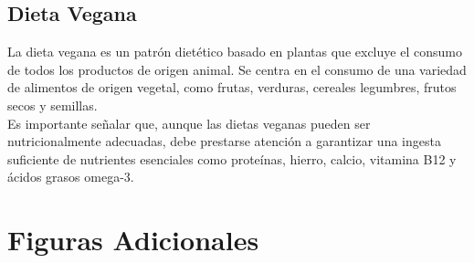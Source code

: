 \documentclass[12pt,a4paper]{article}
\begin{document}
{{        \subsection{Dieta Vegana}
        {
            \cite{marvastipopular} La dieta vegana es un patrón dietético basado en 
            plantas que excluye el consumo de todos los productos de origen animal. Se 
            centra en el consumo de una variedad de alimentos de origen vegetal, como 
            frutas, verduras, cereales legumbres, frutos secos y semillas.\\

            Es importante señalar que, aunque las dietas veganas pueden ser 
            nutricionalmente adecuadas, debe prestarse atención a garantizar una 
            ingesta suficiente de nutrientes esenciales como proteínas, hierro, 
            calcio, vitamina B12 y ácidos grasos omega-3.
        }
        }

        \newpage

        \section{Figuras Adicionales}\label{anexo:B}
        {
}}
\end{document}
